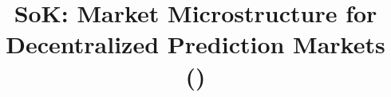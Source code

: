 \documentclass[runningheads]{llncs}
\begin{document}
\title{ SoK: Market Microstructure for Decentralized Prediction Markets (\depms)}

%
	
\maketitle














\clearpage
\appendix
%

\end{document}
